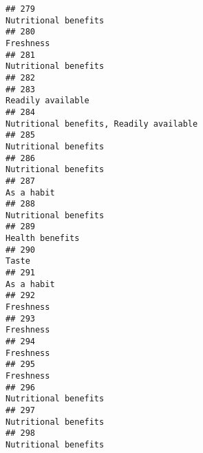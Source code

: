 \documentclass[
]{article}
\begin{document}
\begin{verbatim}
## 279                                                                                                       Nutritional benefits
## 280                                                                                                                  Freshness
## 281                                                                                                       Nutritional benefits
## 282                                                                                                                           
## 283                                                                                                          Readily available
## 284                                                                                    Nutritional benefits, Readily available
## 285                                                                                                       Nutritional benefits
## 286                                                                                                       Nutritional benefits
## 287                                                                                                                 As a habit
## 288                                                                                                       Nutritional benefits
## 289                                                                                                            Health benefits
## 290                                                                                                                      Taste
## 291                                                                                                                 As a habit
## 292                                                                                                                  Freshness
## 293                                                                                                                  Freshness
## 294                                                                                                                  Freshness
## 295                                                                                                                  Freshness
## 296                                                                                                       Nutritional benefits
## 297                                                                                                       Nutritional benefits
## 298                                                                                                       Nutritional benefits

\end{verbatim}
\end{document}

